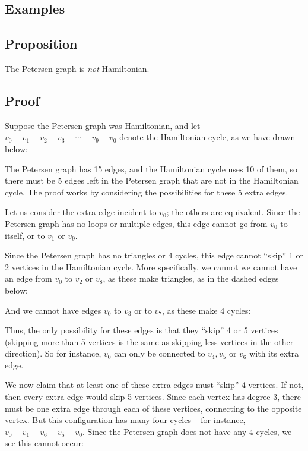 \documentclass[]{article}
\begin{document}
\subsection{Examples}\label{examples-1}

\subsection{Proposition}\label{proposition}

The Petersen graph is \emph{not} Hamiltonian.

\subsection{Proof}\label{proof-4}

Suppose the Petersen graph was Hamiltonian, and let
\(v_0-v_1-v_2-v_3-\cdots-v_{9}-v_0\) denote the Hamiltonian cycle, as we
have drawn below:

The Petersen graph has 15 edges, and the Hamiltonian cycle uses 10 of
them, so there must be 5 edges left in the Petersen graph that are not
in the Hamiltonian cycle. The proof works by considering the
possibilities for these 5 extra edges.

Let us consider the extra edge incident to \(v_0\); the others are
equivalent. Since the Petersen graph has no loops or multiple edges,
this edge cannot go from \(v_0\) to itself, or to \(v_1\) or \(v_9\).

Since the Petersen graph has no triangles or 4 cycles, this edge cannot
``skip'' 1 or 2 vertices in the Hamiltonian cycle. More specifically, we
cannot we cannot have an edge from \(v_0\) to \(v_2\) or \(v_8\), as
these make triangles, as in the dashed edges below:

And we cannot have edges \(v_0\) to \(v_3\) or to \(v_7\), as these make
4 cycles:

Thus, the only possibility for these edges is that they ``skip'' 4 or 5
vertices (skipping more than 5 vertices is the same as skipping less
vertices in the other direction). So for instance, \(v_0\) can only be
connected to \(v_4, v_5\) or \(v_6\) with its extra edge.

We now claim that at least one of these extra edges must ``skip'' 4
vertices. If not, then every extra edge would skip 5 vertices. Since
each vertex has degree 3, there must be one extra edge through each of
these vertices, connecting to the opposite vertex. But this
configuration has many four cycles -- for instance,
\(v_0-v_1-v_6-v_5-v_0\). Since the Petersen graph does not have any 4
cycles, we see this cannot occur:
\end{document}

